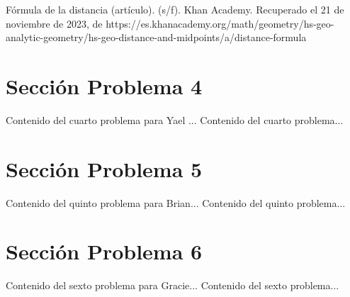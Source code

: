 \documentclass{IEEEcsmag}
\begin{document}
\begin{thebibliography}{00}
    Fórmula de la distancia (artículo). (s/f). Khan Academy. Recuperado el 21 de noviembre de 2023, de https://es.khanacademy.org/math/geometry/hs-geo-analytic-geometry/hs-geo-distance-and-midpoints/a/distance-formula
\end{thebibliography}












\newpage 


\section{Sección Problema 4}
Contenido del cuarto problema para Yael ...
\newpage 
Contenido del cuarto problema...
\newpage 


\section{Sección Problema 5}
Contenido del quinto problema para Brian...
\newpage 
Contenido del quinto problema...
\newpage 


\section{Sección Problema 6}
Contenido del sexto problema para Gracie...
\newpage 
Contenido del sexto problema...
\newpage 
\end{document}
